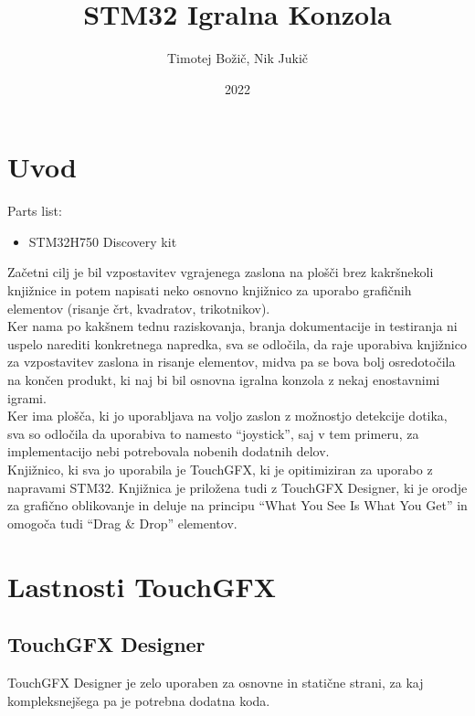 \documentclass{article}
\author{Timotej Bo\v{z}i\v{c}, Nik Juki\v{c}}
\title{STM32 Igralna Konzola}
\date{2022}
\begin{document}
\maketitle

\tableofcontents

\clearpage

\section{Uvod}
\noindent
Parts list:
\begin{itemize}
  \item STM32H750 Discovery kit
\end{itemize}

\noindent
Za\v{c}etni cilj je bil vzpostavitev vgrajenega zaslona na
plo\v{s}\v{c}i brez kakr\v{s}nekoli knji\v{z}nice in potem napisati
neko osnovno knji\v{z}nico za uporabo grafi\v{c}nih elementov
(risanje \v{c}rt, kvadratov, trikotnikov). \\
Ker nama po kak\v{s}nem tednu raziskovanja, branja dokumentacije in testiranja
ni uspelo narediti konkretnega napredka, sva se
odlo\v{c}ila, da raje uporabiva knji\v{z}nico za vzpostavitev
zaslona in risanje elementov, midva pa se bova bolj osredoto\v{c}ila
na kon\v{c}en produkt, ki naj bi bil osnovna igralna konzola z nekaj
enostavnimi igrami. \\
Ker ima plo\v{s}\v{c}a, ki jo uporabljava na voljo zaslon z mo\v{z}nostjo
detekcije dotika, sva so odlo\v{c}ila da uporabiva to namesto ``joystick'',
saj v tem primeru, za implementacijo nebi potrebovala nobenih dodatnih
delov. \\

\noindent
Knji\v{z}nico, ki sva jo uporabila je TouchGFX, ki je opitimiziran za
uporabo z napravami STM32. Knji\v{z}nica je prilo\v{z}ena tudi z
TouchGFX Designer, ki je orodje za grafi\v{c}no oblikovanje in deluje
na principu ``What You See Is What You Get'' in omogo\v{c}a tudi
``Drag \& Drop'' elementov. \\

\section{Lastnosti TouchGFX}
\subsection{TouchGFX Designer}
\noindent
TouchGFX Designer je zelo uporaben za osnovne in stati\v{c}ne
strani, za kaj kompleksnej\v{s}ega pa je potrebna
dodatna koda. \\
\end{document}
